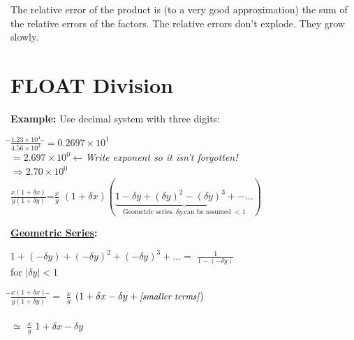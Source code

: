 \documentclass[a4paper,12pt]{report}
\begin{document}
	The relative error of the product is (to a very good approximation) the sum of the relative errors of 
	the factors. The relative errors don't explode.  They grow slowly.

\section{FLOAT Division}

	\noindent \textbf{Example:} Use decimal system with three digits:

\begin{tabbing}
	\hspace*{4cm}\=\Large{$\frac{1.23 \times 10^4}{4.56 \times 10^3}$}
	\hspace*{0.1cm}\=\normalsize{$=0.2697\times 10^1$}\\
	\>\>$=2.697\times 10^0 \!\leftarrow$\footnotesize{\textit{Write exponent so it isn't forgotten!}}\\
	\> \> $\Rightarrow 2.70 \times 10^0$\\
	\> \Large{$\frac{x(1+\delta x)}{y(1+\delta y)}$}\>=\Large{$\frac{x}{y}$}
		\normalsize{$(1+\delta x)
		(\underbrace{1-\delta y+(\delta y)^2-(\delta y)^3+-...}_{\text{Geometric series.}\;\delta y\;
		\text{can be assumed}\;<1})$}
\end{tabbing}

\begin{center}
\fbox
{
	\parbox{0.6\textwidth}
	{
			\textbf{\underline{Geometric Series}:}
			\begin{center}
				$1+ (-\delta y) + (-\delta y)^2 + (-\delta y)^3 + ...
				=$ \large{$\frac{1}{1-(-\delta y)}$}\\
				\medskip
				for $\left| \delta y \right| <1$
			\end{center}
	}
}
\end{center}

\begin{tabbing}
	\hspace*{4.1cm}\=\Large{$\frac{x(1+\delta x)}{y(1+\delta y)}$}
	\hspace*{0.1cm} \= \normalsize{$=$} \Large{$\frac{x}{y}$}
		\normalsize{$(1 + \delta x - \delta y + \text{\small{\textit{[smaller terms]}}})$}\\
	\medskip \\
	 \>\> \normalsize{$\simeq$} \Large{$\frac{x}{y}$} \normalsize{$1+ \delta x - \delta y$}
\end{tabbing}
\end{document}
